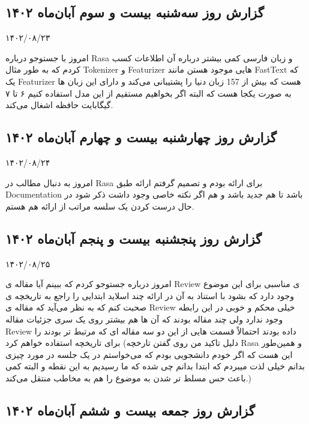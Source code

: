 \subsection{گزارش روز سه‌شنبه بیست و سوم آبان‌ماه ۱۴۰۲}

۱۴۰۲/۰۸/۲۳

امروز با جستوجو درباره Rasa و زبان فارسی کمی بیشتر درباره آن اطلاعات کسب کردم که به طور مثال Tokenizer و Featurizer هایی موجود هستن مانند FastText که یک Featurizer هست که بیش از 157 زبان دنیا را پشتیبانی می‌کند و دارای  این زبان ها به صورت یکجا هست که البته اگر بخواهیم مستقیم از این مدل استفاده کنیم ۶ تا  ۷ گیگابایت حافظه اشغال می‌کند.

\subsection{گزارش روز چهارشنبه بیست و چهارم آبان‌ماه ۱۴۰۲}

۱۴۰۲/۰۸/۲۴

امروز به دنبال مطالب در Rasa برای ارائه بودم و تصمیم گرفتم ارائه طبق Documentation باشد تا هم جدید باشد و هم اگر نکته خاصی وجود داشت ذکر شود در حال درست کردن یک سلسه مراتب از ارائه هم هستم.

\subsection{گزارش روز پنجشنبه بیست و پنجم آبان‌ماه ۱۴۰۲}

۱۴۰۲/۰۸/۲۵

امروز درباره  جستوجو کردم که ببینم آیا مقاله ی Review ی مناسبی برای این موضوع وجود دارد که بشود با استناد به آن در ارائه چند اسلاید ابتدایی را راجع به تاریخچه ی  صحبت کنم که به نظر می‌آید که مقاله ی Review خیلی محکم و خوبی در این رابطه وجود ندارد ولی چند مقاله بودند که آن ها هم بیشتر روی یک سری جزئیات  مقاله Review داده بودند احتمالاً قسمت هایی از این دو سه مقاله ای که مرتبط تر بودند را برای تاریخچه  استفاده خواهم کرد (دلیل تاکید من روی گفتن تارخچه Rasa و همین‌طور  این هست که اگر خودم دانشجویی بودم که می‌خواستم در یک جلسه در مورد  چیزی بدانم خیلی لذت میبردم که ابتدا بدانم چی شده که ما رسیدیم به این نقطه و البته کمی باعث حس مسلط تر شدن به موضوع را هم به مخاطب منتقل می‌کند.)


\subsection{گزارش روز جمعه بیست و ششم آبان‌ماه ۱۴۰۲}

